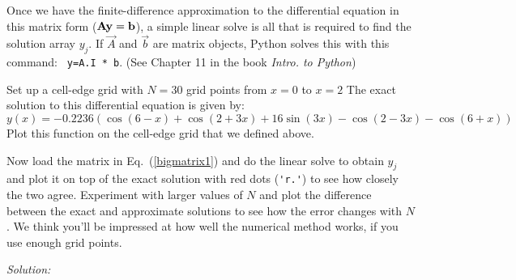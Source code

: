 Once we have the finite-difference approximation to the differential
equation in this matrix form (${\bf A} {\bf y}=\bf{b}$), a simple
linear solve is all that is required to find the solution array
$y_j$. If $\vec{A}$ and $\vec{b}$ are matrix objects, Python solves
this with this command: {\tt
y=A.I * b}.  (See Chapter 11 in the book {\it Intro. to Python})

\begin{enumerate}
\probtwo 
\begin{enumerate}
\subprob Set up a cell-edge grid with $N=30$ grid points from $x = 0$
to $x = 2$
\subprob The exact solution to this differential equation is given by:
\begin{equation}
y(x) = -0.2236 \left( \cos(6 - x) + \cos(2 + 3x) + 16 \sin(3 x) -
  \cos(2 - 3x) - \cos(6 + x)\right)
\end{equation}
Plot this function on the cell-edge grid that we defined above.
\subprob \label{P:2.1c} 

    Now load the matrix in Eq.~(\ref{bigmatrix1}) and do the
    linear solve to obtain $y_j$ and plot it on top of the
    exact solution with red dots (\verb|'r.'|) to see how
    closely the two agree. Experiment with larger values of
    $N$ and plot the difference between the exact and
    approximate solutions to see how the error changes with
    $N$. We think you'll be impressed at how well the
    numerical method works, if you use enough grid points.
\end{enumerate}
\end{enumerate}
\ifsolutions
\textit{Solution:}\\
